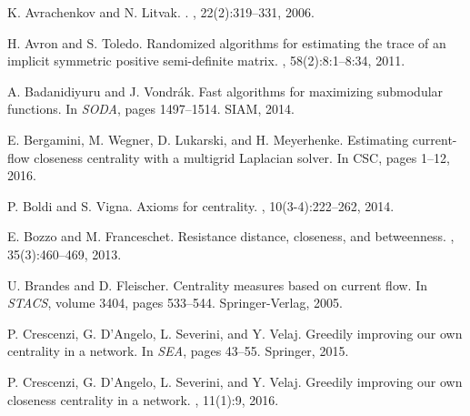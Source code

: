 \documentclass{article}
\begin{document}
\begin{thebibliography}{}

K. Avrachenkov and N. Litvak.
.
, 22(2):319--331, 2006.

H. Avron and S. Toledo.
\newblock Randomized algorithms for estimating the trace of an implicit
  symmetric positive semi-definite matrix.
, 58(2):8:1--8:34, 2011.

A. Badanidiyuru and J. Vondr{\'a}k.
\newblock Fast algorithms for maximizing submodular functions.
\newblock In {\em SODA}, pages 1497--1514. SIAM, 2014.

E. Bergamini, M. Wegner, D. Lukarski, and H. Meyerhenke.
\newblock Estimating current-flow closeness centrality with a multigrid
  {L}aplacian solver.
\newblock In {CSC}, pages 1--12, 2016.

P. Boldi and S. Vigna.
\newblock Axioms for centrality.
, 10(3-4):222--262, 2014.

E. Bozzo and M. Franceschet.
\newblock Resistance distance, closeness, and betweenness.
, 35(3):460--469, 2013.

U. Brandes and D. Fleischer.
\newblock Centrality measures based on current flow.
\newblock In {\em STACS}, volume 3404, pages 533--544. Springer-Verlag, 2005.

P. Crescenzi, G. D'Angelo, L. Severini, and Y. Velaj.
\newblock Greedily improving our own centrality in a network.
\newblock In {\em SEA}, pages 43--55. Springer, 2015.

P. Crescenzi, G. D'Angelo, L. Severini, and Y. Velaj.
\newblock Greedily improving our own closeness centrality in a network.
, 11(1):9,
  2016.


\end{thebibliography}
\end{document}

